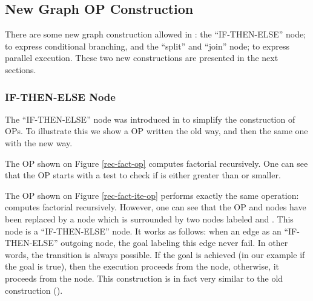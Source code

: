 \subsection{New Graph OP Construction}

There are some new graph construction
allowed in \coprsde{}: the ``IF-THEN-ELSE'' node; to express conditional branching, and the
``split'' and ``join'' node; to express parallel execution. These two new
constructions are presented in the next sections.



\subsubsection{IF-THEN-ELSE Node}

The ``IF-THEN-ELSE'' node was introduced in \COPRS{} to simplify the
construction of OPs. To illustrate this we show a OP written the old way, and
then the same one with the new way.


The OP shown on Figure \ref{rec-fact-op} computes factorial recursively.
One can see that the OP starts with a test to check if  is either
greater than  or smaller.


The OP shown on Figure \ref{rec-fact-ite-op} performs exactly the same
operation: computes factorial recursively. However, one can see that the OP
 and  nodes have been replaced by a  node which is
surrounded by two nodes labeled  and . This node  is
a ``IF-THEN-ELSE'' node. It works as follows: when an edge as an
``IF-THEN-ELSE'' outgoing node, the goal labeling this edge never fail. In
other words, the transition is always possible. If the goal is achieved (in our
example if the goal  is true), then the execution proceeds
from the  node, otherwise, it proceeds from the  node. This
construction is in fact very similar to the old  construction
().


